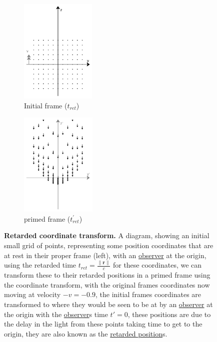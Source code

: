 \begin{figure}[H]
	\centering
	\begin{subfigure}{0.45\textwidth}
		\centering
		\includegraphics[height=5cm]{images/pdf/coord_transform_initial_with_retarded_time.pdf}
		\caption{Initial frame (${t_{ret}}$)}
		\label{fig: retarded coordinate transform subfig_1}
	\end{subfigure}
	\begin{subfigure}{0.45\textwidth}
		\centering
		\includegraphics[height=5cm]{images/pdf/coord_transform_primed_retarded.pdf}
		\caption{primed frame (${t_{ret}^{'}}$)}
		\label{fig: retarded coordinate transform subfig_2}
	\end{subfigure}
	\caption{\textbf{Retarded coordinate transform.} A diagram, showing an initial small grid of points, representing some position coordinates that are at rest in their proper frame (left), with an \protect\hyperlink{def-observer}{observer} at the origin, using the retarded time ${t_{ret}} = \frac{\|\mathbf{r}\|}{c}$ for these coordinates, we can transform these to their retarded positions in a primed frame using the coordinate transform, with the original frames coordinates now moving at velocity $-{v} =-0.9$, the initial frames coordinates are transformed to where they would be seen to be at by an \protect\hyperlink{def-observer}{observer} at the origin with the \protect\hyperlink{def-observer}{observer}s time ${t{'}} = 0$, these positions are due to the delay in the light from these points taking time to get to the origin, they are also known as the \protect\hyperlink{def-retarded-position}{retarded position}s.}
	\label{fig: retarded coordinate transform}
\end{figure}

